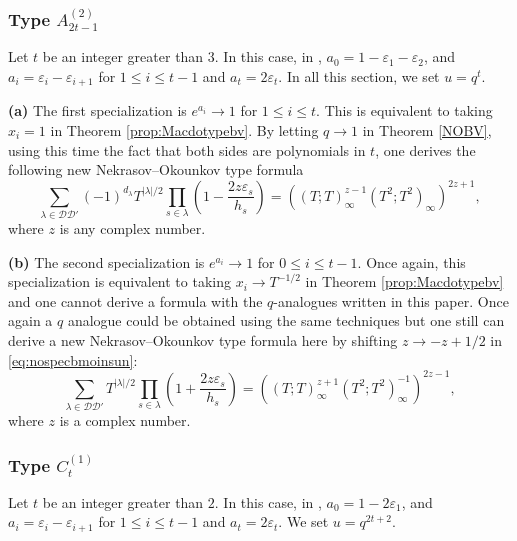 \documentclass[11pt,letterpaper]{amsart}
\def\ccdd{\mathcal {DD}}
\numberwithin{equation}{section}
\numberwithin{df}{section}
\begin{document}


%

\subsubsection{Type $A^{(2)}_{2t-1}$}
Let $t$ be an integer greater than $3$.
In this case, in \cite{Mac}, $a_0=1-\varepsilon_1-\varepsilon_2$, and $a_i=\varepsilon_i-\varepsilon_{i+1}$ for $1\leq i\leq t-1$ and $a_t=2\varepsilon_t$.  In all this section, we set $u=q^{t}$.

\textbf{(a)} The first specialization is $e^{a_i}\to 1$ for $1\leq i\leq t$. This is equivalent to taking $x_i=1$ in Theorem \ref{prop:Macdotypebv}. By letting $q\rightarrow 1$ in Theorem \ref{NOBV}, using this time the fact that both sides are polynomials in $t$, one derives the following new Nekrasov--Okounkov type formula
\begin{equation}\label{eq:nospecbv}
\sum_{\lambda\in\ccdd'}(-1)^{d_\lambda}T^{\lvert \lambda\rvert/2}\prod_{s\in\lambda}\left(1-\frac{2z\varepsilon_s}{h_s}\right)=\left(\left(T;T\right)_{\infty}^{z-1}\left(T^2;T^2\right)_{\infty}\right)^{2z+1},
\end{equation}
where $z$ is any complex number.

\textbf{(b)} The second specialization is $e^{a_i}\to 1$ for $0\leq i\leq t-1$. Once again, this specialization is equivalent to taking $x_i\to T^{-1/2}$ in Theorem \ref{prop:Macdotypebv} and one cannot derive a formula with the $q$-analogues written in this paper. Once again a $q$ analogue could be obtained using the same techniques but one still can derive a new Nekrasov--Okounkov type formula here by shifting $z\to -z+1/2$ in \eqref{eq:nospecbmoinsun}:
\begin{equation}\label{eq:nospecbvweirg}
\sum_{\lambda\in\ccdd'}T^{\lvert \lambda\rvert/2}\prod_{s\in\lambda}\left(1+\frac{2z\varepsilon_s}{h_s}\right)=\left(\left(T;T\right)_{\infty}^{z+1}\left(T^2;T^2\right)_{\infty}^{-1}\right)^{2z-1},
\end{equation}
where $z$ is a complex number.

\subsubsection{Type $C^{(1)}_{t}$}
Let $t$ be an integer greater than $2$.
In this case, in \cite{Mac}, $a_0=1-2\varepsilon_1$, and $a_i=\varepsilon_i-\varepsilon_{i+1}$ for $1\leq i\leq t-1$ and $a_t=2\varepsilon_t$. We set $u=q^{2t+2}$.
\end{document}
